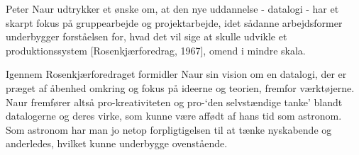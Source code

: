 Peter Naur udtrykker et ønske om, at den nye uddannelse - datalogi - har et
skarpt fokus på gruppearbejde og projektarbejde, idet sådanne arbejdsformer
underbygger forståelsen for, hvad det vil sige at skulle udvikle et
produktionssystem [Rosenkjærforedrag, 1967], omend i mindre skala.

Igennem Rosenkjærforedraget formidler Naur sin vision om en datalogi, der er
præget af åbenhed omkring og fokus på ideerne og teorien, fremfor værktøjerne.
Naur fremfører altså pro-kreativiteten og pro-`den selvstændige tanke' blandt
datalogerne og deres virke, som kunne være affødt af hans tid som astronom.
Som astronom har man jo netop forpligtigelsen til at tænke nyskabende og
anderledes, hvilket kunne underbygge ovenstående.
